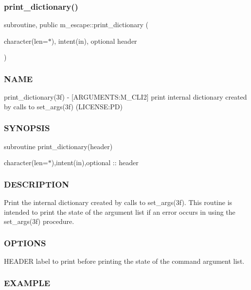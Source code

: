 \subsubsection{\texorpdfstring{print\+\_\+dictionary()}{print\_dictionary()}}
{\footnotesize\ttfamily subroutine, public m\+\_\+escape\+::print\+\_\+dictionary (\begin{DoxyParamCaption}\item[{character(len=$\ast$), intent(in), optional}]{header }\end{DoxyParamCaption})}



\subsubsection*{N\+A\+ME}

print\+\_\+dictionary(3f) -\/ \mbox{[}A\+R\+G\+U\+M\+E\+N\+TS\+:M\+\_\+\+C\+L\+I2\mbox{]} print internal dictionary created by calls to set\+\_\+args(3f) (L\+I\+C\+E\+N\+SE\+:PD) \subsubsection*{S\+Y\+N\+O\+P\+S\+IS}

subroutine print\+\_\+dictionary(header)

character(len=$\ast$),intent(in),optional \+:\+: header \subsubsection*{D\+E\+S\+C\+R\+I\+P\+T\+I\+ON}

Print the internal dictionary created by calls to set\+\_\+args(3f). This routine is intended to print the state of the argument list if an error occurs in using the set\+\_\+args(3f) procedure. \subsubsection*{O\+P\+T\+I\+O\+NS}

H\+E\+A\+D\+ER label to print before printing the state of the command argument list. \subsubsection*{E\+X\+A\+M\+P\+LE}

